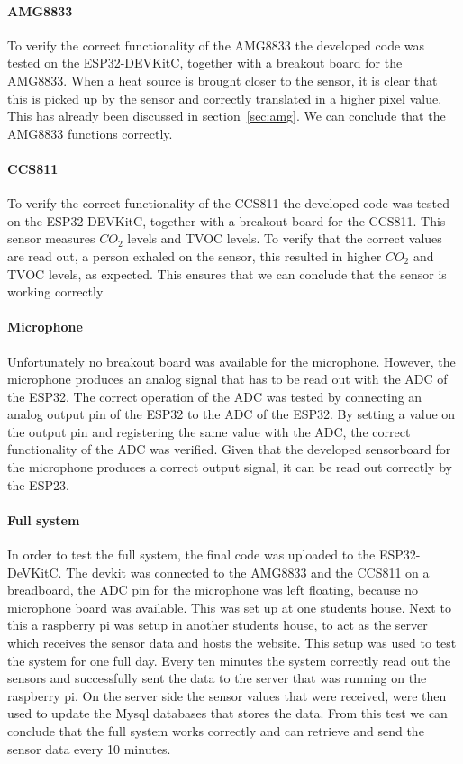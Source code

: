 \documentclass[11pt,a4paper]{article}
\begin{document}
\paragraph{AMG8833}
To verify the correct functionality of the AMG8833 the developed code was tested on the ESP32-DEVKitC, together with a breakout board for the AMG8833. When a heat source is brought closer to the sensor, it is clear that this is picked up by the sensor and correctly translated in a higher pixel value. This has already been discussed in section~\ref{sec:amg}. We can conclude that the AMG8833 functions correctly. 
\paragraph{CCS811}
To verify the correct functionality of the CCS811 the developed code was tested on the ESP32-DEVKitC, together with a breakout board for the CCS811. This sensor measures $CO_2$ levels and TVOC levels. To verify that the correct values are read out, a person exhaled on the sensor, this resulted in higher $CO_2$ and TVOC levels, as expected. This ensures that we can conclude that the sensor is working correctly
\paragraph{Microphone}
Unfortunately no breakout board was available for the microphone. However, the microphone produces an analog signal that has to be read out with the ADC of the ESP32. The correct operation of the ADC was tested by connecting an analog output pin of the ESP32 to the ADC of the ESP32. By setting a value on the output pin and registering the same value with the ADC, the correct functionality of the ADC was verified. Given that the developed sensorboard for the microphone produces a correct output signal, it can be read out correctly by the ESP23. 

\paragraph{Full system}
In order to test the full system, the final code was uploaded to the ESP32-DeVKitC. The devkit was connected to the AMG8833 and the CCS811 on a breadboard, the ADC pin for the microphone was left floating, because no microphone board was available. This was set up at one students house. Next to this a raspberry pi was setup in another students house, to act as the server which receives the sensor data and hosts the website. This setup was used to test the system for one full day. Every ten minutes the system correctly read out the sensors and successfully sent the data to the server that was running on the raspberry pi. On the server side the sensor values that were received, were then used to update the Mysql databases that stores the data. From this test we can conclude that the full system works correctly and can retrieve and send the sensor data every 10 minutes. \\
\end{document}
